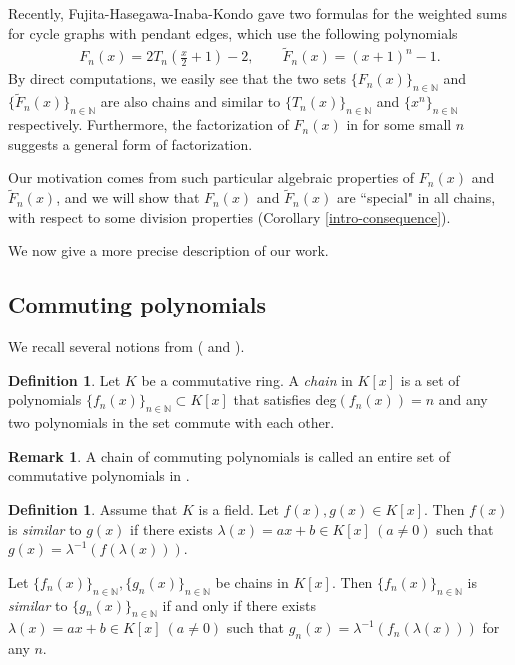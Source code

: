 \documentclass[a4paper, 11pt]{amsart}
\numberwithin{equation}{section}
\theoremstyle{definition}
\newtheorem{defn}[thm]{Definition}
\newtheorem{rmk}[thm]{Remark}
\newcommand{\Z}{\mathbb{Z}}
\newcommand{\N}{\mathbb{N}}
\begin{document}
Recently, Fujita-Hasegawa-Inaba-Kondo \cite{FHIK} gave two formulas for the weighted sums for cycle graphs with pendant edges, which use the following polynomials
\begin{align}\label{Fn}
F_n(x)=2T_n\left(\frac{x}2+1\right)-2,\qquad 
\tilde{F}_n(x)=(x+1)^n-1.
\end{align}
By direct computations, we easily see that the two sets $\{F_n(x)\}_{n\in\N}$ and $\{\tilde{F}_n(x)\}_{n\in\N}$ are also chains and similar to $\{T_n(x)\}_{n\in\N}$ and $\{x^n\}_{n\in\N}$ respectively.
Furthermore, the factorization of $F_n(x)$ in \cite{FHIK} for some small $n$ suggests a general form of factorization.
 
Our motivation comes from such particular algebraic properties of $F_n(x)$ and $\tilde{F}_n(x)$, and we will show that $F_n(x)$ and $\tilde{F}_n(x)$ are ``special" in all chains, with respect to some division properties (Corollary \ref{intro-consequence}).

We now give a more precise description of our work.




\subsection{Commuting polynomials}
We recall several notions from \cite{Z} (\cite{BT} and \cite{W}).


\begin{defn}\label{chain}
Let $K$ be a commutative ring.
A \textit{chain} in $K[x]$ is a set of polynomials $\{f_n(x)\}_{n \in \N}\subset K[x]$ that satisfies deg$(f_n(x)) = n$ and any two polynomials in the set commute with each other. 
\end{defn}

\begin{rmk}
A chain of commuting polynomials is called an entire set of commutative polynomials in \cite{BT}.
\end{rmk}

\begin{defn}
Assume that $K$ is a field.
Let $f(x), g(x) \in K[x]$.
Then $f(x)$ is \textit{similar} to $g(x)$ if there exists $\lambda(x) = ax + b\in K[x]\ (a \neq 0)$ such that $g(x)=\lambda^{-1}( f( \lambda(x)))$.

Let $\{f_n(x)\}_{n\in \N}, \{g_n(x)\}_{n\in \N}$ be chains in $K[x]$.
Then $\{f_n(x)\}_{n\in \N}$ is \textit{similar} to $\{g_n(x)\}_{n\in \N}$ if and only if there exists $\lambda(x) = ax + b\in K[x]\ (a \neq 0)$ such that $g_n(x)=\lambda^{-1}( f_n( \lambda(x)))$ for any $n$.
\end{defn}
\end{document}
